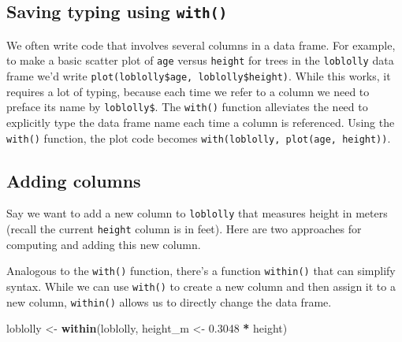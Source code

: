 \documentclass[
  11pt,
]{krantz}
\newenvironment{Shaded}{\begin{snugshade}}{\end{snugshade}}
\newcommand{\CommentTok}[1]{\textcolor[rgb]{0.56,0.35,0.01}{\textit{#1}}}
\newcommand{\FloatTok}[1]{\textcolor[rgb]{0.00,0.00,0.81}{#1}}
\newcommand{\KeywordTok}[1]{\textcolor[rgb]{0.13,0.29,0.53}{\textbf{#1}}}
\newcommand{\NormalTok}[1]{#1}
\newcommand{\OperatorTok}[1]{\textcolor[rgb]{0.81,0.36,0.00}{\textbf{#1}}}
\newcommand{\StringTok}[1]{\textcolor[rgb]{0.31,0.60,0.02}{#1}}
\theoremstyle{definition}
\theoremstyle{definition}
\theoremstyle{definition}
\theoremstyle{definition}
\theoremstyle{remark}
\begin{document}
\hypertarget{with}{%
\subsection{\texorpdfstring{Saving typing using \texttt{with()}}{Saving typing using with()}}\label{with}}

We often write code that involves several columns in a data frame. For example, to make a basic scatter plot of \texttt{age} versus \texttt{height} for trees in the \texttt{loblolly} data frame we'd write \texttt{plot(loblolly\$age,\ loblolly\$height)}. While this works, it requires a lot of typing, because each time we refer to a column we need to preface its name by \texttt{loblolly\$}. The \texttt{with()} function alleviates the need to explicitly type the data frame name each time a column is referenced. Using the \texttt{with()} function, the plot code becomes \texttt{with(loblolly,\ plot(age,\ height))}.

\hypertarget{adding-columns}{%
\subsection{Adding columns}\label{adding-columns}}

Say we want to add a new column to \texttt{loblolly} that measures height in meters (recall the current \texttt{height} column is in feet). Here are two approaches for computing and adding this new column.

\begin{Shaded}
\end{Shaded}

Analogous to the \texttt{with()} function, there's a function \texttt{within()} that can simplify syntax. While we can use \texttt{with()} to create a new column and then assign it to a new column, \texttt{within()} allows us to directly change the data frame.

\begin{Shaded}
\begin{Highlighting}[]
\NormalTok{loblolly \textless{}{-}}\StringTok{ }\KeywordTok{within}\NormalTok{(loblolly, height\_m \textless{}{-}}\StringTok{ }\FloatTok{0.3048} \OperatorTok{*}\StringTok{ }\NormalTok{height)}
\end{Highlighting}
\end{Shaded}
\end{document}
